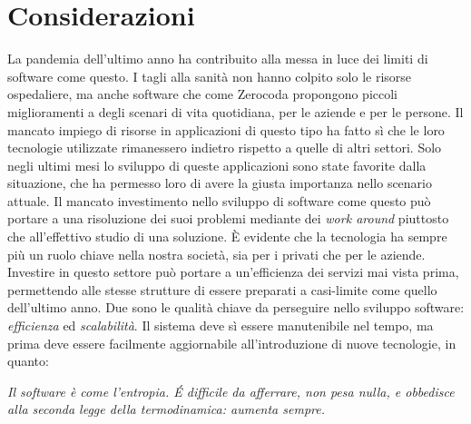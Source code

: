 \section*{Considerazioni}
La pandemia dell'ultimo anno ha contribuito alla messa in luce dei limiti di software come questo. I tagli alla sanità non hanno colpito solo le risorse ospedaliere, ma anche software che come Zerocoda propongono piccoli miglioramenti a degli scenari di vita quotidiana, per le aziende e per le persone. Il mancato impiego di risorse in applicazioni di questo tipo ha fatto sì che le loro tecnologie utilizzate rimanessero indietro rispetto a quelle di altri settori. Solo negli ultimi mesi lo sviluppo di queste applicazioni sono state favorite dalla situazione, che ha permesso loro di avere la giusta importanza nello scenario attuale. Il mancato investimento nello sviluppo di software come questo può portare a una risoluzione dei suoi problemi mediante dei \emph{work around} piuttosto che all'effettivo studio di una soluzione. È evidente che la tecnologia ha sempre più un ruolo chiave nella nostra società, sia per i privati che per le aziende. Investire in questo settore può portare a un'efficienza dei servizi mai vista prima, permettendo alle stesse strutture di essere preparati a casi-limite come quello dell'ultimo anno. Due sono le qualità chiave da perseguire nello sviluppo software: \emph{efficienza} ed \emph{scalabilità}. Il sistema deve sì essere manutenibile nel tempo, ma prima deve essere facilmente aggiornabile all'introduzione di nuove tecnologie, in quanto:
\begin{center}
    \textit{Il software è come l'entropia. É difficile da afferrare, non pesa nulla, e obbedisce alla seconda legge della termodinamica: aumenta sempre.}
\end{center}